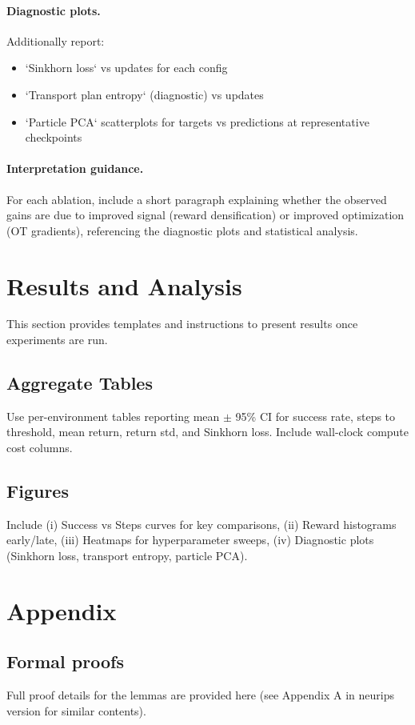 \documentclass[10pt,twocolumn]{article}
\begin{document}
\paragraph{Diagnostic plots.} Additionally report:
\begin{itemize}
  \item `Sinkhorn loss` vs updates for each config
  \item `Transport plan entropy` (diagnostic) vs updates
  \item `Particle PCA` scatterplots for targets vs predictions at representative checkpoints
\end{itemize}

\paragraph{Interpretation guidance.} For each ablation, include a short paragraph explaining whether the observed gains are due to improved signal (reward densification) or improved optimization (OT gradients), referencing the diagnostic plots and statistical analysis.

\section{Results and Analysis}
This section provides templates and instructions to present results once experiments are run.

\subsection{Aggregate Tables}
Use per-environment tables reporting mean $\pm$ 95\% CI for success rate, steps to threshold, mean return, return std, and Sinkhorn loss. Include wall-clock compute cost columns.

\subsection{Figures}
Include (i) Success vs Steps curves for key comparisons, (ii) Reward histograms early/late, (iii) Heatmaps for hyperparameter sweeps, (iv) Diagnostic plots (Sinkhorn loss, transport entropy, particle PCA).

\section{Appendix}
\subsection{Formal proofs}
Full proof details for the lemmas are provided here (see Appendix A in neurips version for similar contents).
\end{document}
